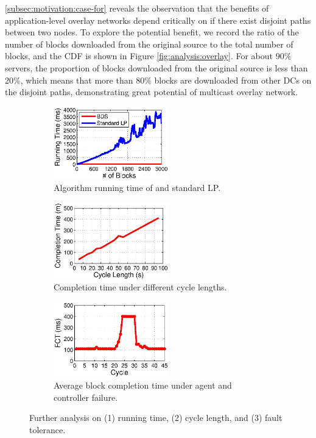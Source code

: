  \Section\ref{subsec:motivation:case-for} reveals the observation that the benefits of application-level overlay networks depend critically on if there exist disjoint paths between two nodes. To explore the potential benefit, we record the ratio of the number of blocks downloaded from the original source to the total number of blocks, and the CDF is shown in Figure \ref{fig:analysis:overlay}. For about 90\% servers, the proportion of blocks downloaded from the original source is less than 20\%, which means that more than 80\% blocks are downloaded from other DCs on the disjoint paths, demonstrating great potential of multicast overlay network.

\begin{figure}[t]
        \centering
        \begin{subfigure}[b]{0.3\textwidth}
                \centering
                \includegraphics[width=50mm]{images/BDSvsLP.eps} %
                \caption{Algorithm running time of \name and standard LP.}
                \label{fig:further:BDSvsLP}
        \end{subfigure}
        \begin{subfigure}[b]{0.3\textwidth}
                \centering
                \includegraphics[width=50mm]{images/cycleDiff.eps}%
                \caption{Completion time under different cycle lengths.}
                \label{fig:further:cycleDiff}
        \end{subfigure}
        \begin{subfigure}[b]{0.3\textwidth}
                \centering
                \includegraphics[width=50mm]{images/failure.eps}%
                \caption{Average block completion time under agent and controller failure.}
                \label{fig:further:failure}
        \end{subfigure}
        \caption{Further analysis on (1) running time, (2) cycle length, and (3) fault tolerance.}
        \label{fig:further}
\vspace{-0.4cm}
\end{figure}

